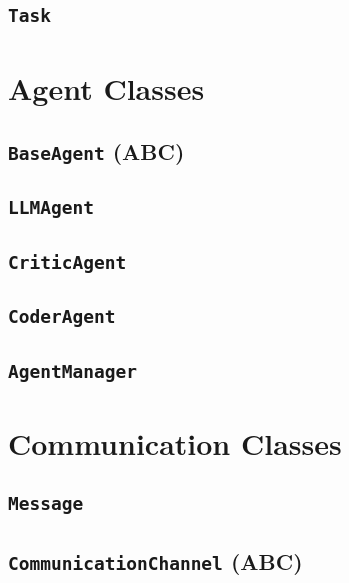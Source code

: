 \documentclass{amsbook}
\theoremstyle{definition}
\theoremstyle{remark}
\numberwithin{equation}{chapter} %
\begin{document}
        \subsection{\texttt{Task}}
    \section{Agent Classes}
        \subsection{\texttt{BaseAgent} (ABC)}
        \subsection{\texttt{LLMAgent}}
        \subsection{\texttt{CriticAgent}}
        \subsection{\texttt{CoderAgent}}
        \subsection{\texttt{AgentManager}}
    \section{Communication Classes}
        \subsection{\texttt{Message}}
        \subsection{\texttt{CommunicationChannel} (ABC)}
\end{document}
